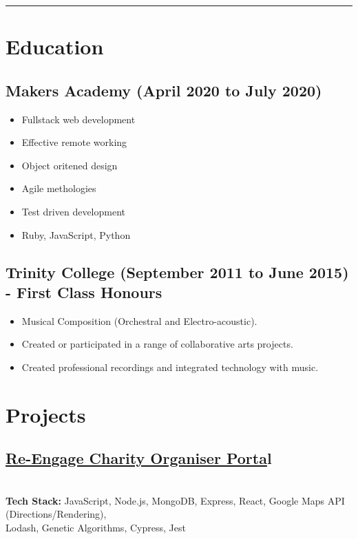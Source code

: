 \documentclass[12pt]{IEEEtran}
\newcommand{\cvrule}{\noindent\rule{8.5cm}{0.4pt}}
\begin{document}
\cvrule

\section*{\textbf{Education}}

\subsection*{Makers Academy (April 2020 to July 2020)}

\begin{itemize}
\item Fullstack web development
\item Effective remote working
\item Object oritened design
\item Agile methologies
\item Test driven development
\item Ruby, JavaScript, Python
\end{itemize}

\subsection*{Trinity College (September 2011 to June 2015) - First Class Honours}
\begin{itemize}
\item Musical Composition (Orchestral and Electro-acoustic).
\item Created or participated in a range of collaborative arts projects.
\item Created professional recordings and integrated technology with music.
\end{itemize}

\vskip 1in
\lipsum[1-2]
\vfill\null
\columnbreak

\section*{\textbf{Projects}}
\subsection*{\href{https://github.com/Tracht/charity-apr2020}{Re-Engage Charity Organiser Porta}l}
 \\[5pt]
\textbf{Tech Stack:} JavaScript, Node.js, MongoDB, Express, React, Google Maps API (Directions/Rendering), \\ Lodash, Genetic Algorithms, Cypress, Jest
\end{document}
